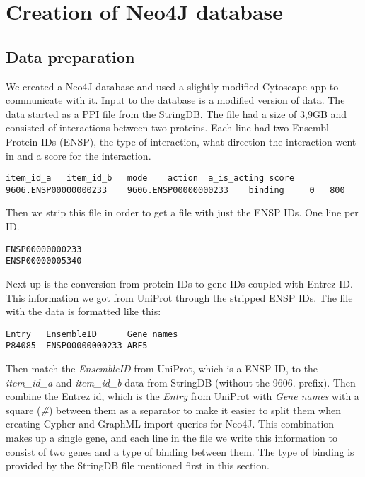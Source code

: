 \chapter{Creation of Neo4J database} %
\section{Data preparation}
We created a Neo4J database and used a slightly modified Cytoscape app to
communicate with it. Input to the database is a modified version of data. The
data started as a PPI file from the StringDB. The file had a size of 3,9GB and
consisted of interactions between two proteins. Each line had two Ensembl
Protein IDs (ENSP), the type of interaction, what direction the interaction went
in and a score for the interaction. 

\begin{verbatim}
item_id_a	item_id_b	mode	action	a_is_acting	score
9606.ENSP00000000233	9606.ENSP00000000233	binding		0	800
\end{verbatim}

Then we strip this file in order to get a file with just the ENSP IDs. One line
per ID.

\begin{verbatim}
ENSP00000000233
ENSP00000005340
\end{verbatim}

Next up is the conversion from protein IDs to gene IDs coupled with Entrez ID.
This information we got from UniProt through the stripped ENSP IDs. The file
with the data is formatted like this:

\begin{verbatim}
Entry	EnsembleID	    Gene names
P84085	ENSP00000000233	ARF5
\end{verbatim}

Then match the \textit{EnsembleID} from UniProt, which is a ENSP ID, to the
\textit{item\_id\_a} and \textit{item\_id\_b} data from StringDB (without the
9606.  prefix). Then combine the Entrez id, which is the \textit{Entry} from
UniProt with \textit{Gene names} with a square (\textit{\#}) between them as
a separator to make it easier to split them when creating Cypher and GraphML
import queries for Neo4J. This combination makes up a single gene, and each line
in the file we write this information to consist of two genes and a type of
binding between them. The type of binding is provided by the StringDB file
mentioned first in this section. %


